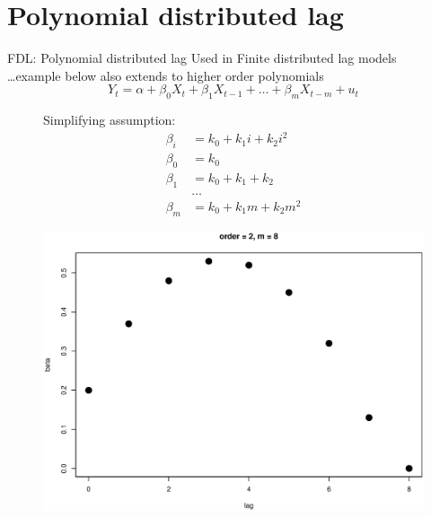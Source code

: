 \documentclass{beamer}
\begin{document}
\section{Polynomial distributed lag}
\begin{frame}{FDL: Polynomial distributed lag}
Used in Finite distributed lag models\\
\dots example below also extends to higher order polynomials
\begin{equation}
Y_t = \alpha + \beta_0 X_t + \beta_1 X_{t-1} + \dots + \beta_m X_{t-m} + u_t 
\end{equation}
\begin{figure}[!htb]
    \centering
    \begin{minipage}{.48\textwidth}
    Simplifying assumption:
\begin{equation}
\begin{aligned}\label{eqpol2}
\beta_i & = k_0 + k_1 i  + k_2  i^2  \\ 
\hline
\beta_0 & = k_0 \\
\beta_1 & = k_0 + k_1 + k_2 \\
& \ldots \\ 
\beta_m & = k_0 +  k_1 m +  k_2 m^2
\end{aligned}
\end{equation}
\end{minipage}
\begin{minipage}{0.509\textwidth}
\includegraphics[width=\textwidth]{img/Polynom_2.eps}
\end{minipage}
\end{figure}
\end{frame}
\end{document}
